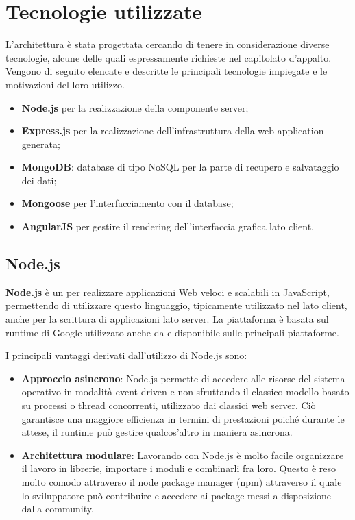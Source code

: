 \section{Tecnologie utilizzate}


L'architettura è stata progettata cercando di tenere in considerazione diverse tecnologie, alcune delle quali espressamente richieste nel capitolato d'appalto. Vengono di seguito elencate e descritte le principali tecnologie impiegate e le motivazioni del loro utilizzo.

\begin{itemize}
	\item \textbf{Node.js} per la realizzazione della componente server;
	\item \textbf{Express.js} per la realizzazione dell’infrastruttura della web application generata;
	\item \textbf{MongoDB}: database di tipo NoSQL per la parte di recupero e salvataggio dei dati;
	\item \textbf{Mongoose} per l’interfacciamento con il database;
	\item \textbf{AngularJS} per gestire il rendering dell'interfaccia grafica lato client.
\end{itemize}


\subsection{Node.js}
\textbf{Node.js} è un  per realizzare applicazioni Web veloci e scalabili in JavaScript, permettendo di utilizzare questo linguaggio, tipicamente utilizzato nel lato client, anche per la scrittura di applicazioni lato server.
La piattaforma è basata sul runtime di Google  utilizzato anche da  e disponibile sulle principali piattaforme.

I principali vantaggi derivati dall'utilizzo di Node.js sono:
\begin{itemize}
	\item \textbf{Approccio asincrono}: Node.js permette di accedere alle risorse del sistema operativo in modalità event-driven e non sfruttando il classico modello basato su processi o thread concorrenti, utilizzato dai classici web server. Ciò garantisce una maggiore efficienza in termini di prestazioni poiché durante le attese, il runtime può gestire qualcos’altro in maniera asincrona.
	\item \textbf{Architettura modulare}: Lavorando con Node.js è molto facile organizzare il lavoro in librerie, importare i moduli e combinarli fra loro. Questo è reso molto comodo attraverso il node package manager (npm) attraverso il quale lo sviluppatore può contribuire e accedere ai package messi a disposizione dalla community.
\end{itemize}

